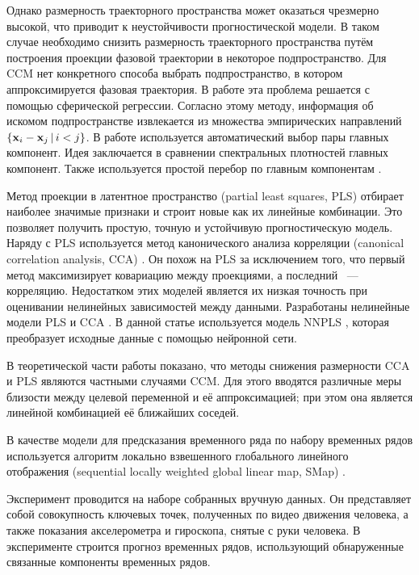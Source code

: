 \documentclass[a4paper, 12pt]{article}
\begin{document}
Однако размерность траекторного пространства может оказаться чрезмерно высокой, что приводит к неустойчивости прогностической модели.
В таком случае необходимо снизить размерность траекторного пространства путём построения проекции фазовой траектории в некоторое подпространство. Для CCM нет конкретного способа выбрать подпространство, в котором аппроксимируется фазовая траектория.
В работе \citep{usmanova2020sphere_regr} эта проблема решается с помощью сферической регрессии. Согласно этому методу, информация об искомом подпространстве извлекается из множества эмпирических направлений $\{ \mathbf{x}_i - \mathbf{x}_j\, | \, i < j \}$.
В работе \citep{alexandrov2005automatic} используется автоматический выбор пары главных компонент. Идея заключается в сравнении спектральных плотностей главных компонент. Также используется простой перебор по главным компонентам \citep{usmanova2019dependencies}.

Метод проекции в латентное пространство (partial least squares, PLS) \citep{rosipal2011nonlinear, rosipal2005overview} отбирает наиболее значимые признаки и строит новые как их линейные комбинации. 
Это позволяет получить простую, точную и устойчивую прогностическую модель.
Наряду с PLS используется метод канонического анализа корреляции (canonical correlation analysis, CCA) \citep{hardoon2004canonical}. 
Он похож на PLS за исключением того, что первый метод максимизирует ковариацию между проекциями, а последний ~--- корреляцию. 
Недостатком этих моделей является их низкая точность при оценивании нелинейных зависимостей между данными.
Разработаны нелинейные модели PLS \citep{qin1992nonlinear} и CCA \citep{andrew2013deep}.
В данной статье используется модель NNPLS \citep{bulut2014new}, которая преобразует исходные данные с помощью нейронной сети. 

В теоретической части работы показано, что методы снижения размерности CCA и PLS являются частными случаями CCM. 
Для этого вводятся различные меры близости между целевой переменной и её аппроксимацией; при этом она является линейной комбинацией её ближайших соседей. 

В качестве модели для предсказания временного ряда по набору временных рядов используется алгоритм локально взвешенного глобального линейного отображения (sequential locally weighted global linear map, SMap) \citep{sugihara1994nonlinear}.

Эксперимент проводится на наборе собранных вручную данных. Он представляет собой совокупность ключевых точек, полученных 
по видео движения человека, а также показания акселерометра и гироскопа, снятые с руки человека. 
В эксперименте строится прогноз временных рядов, использующий обнаруженные связанные компоненты временных рядов.
\end{document}
